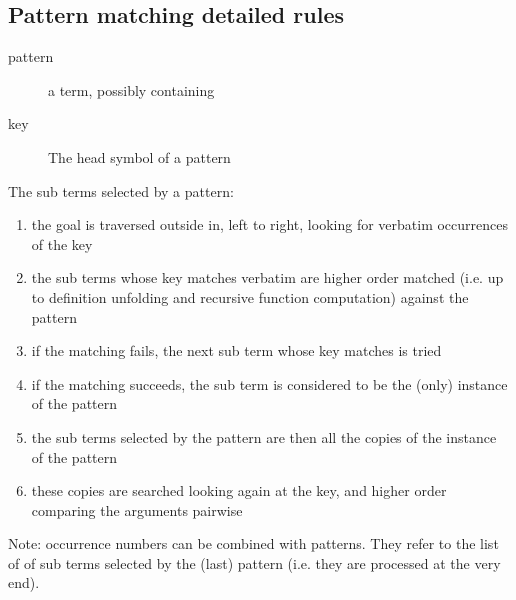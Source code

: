 \begin{landscape}
\begin{small}
\begin{multicols*}{3}[\begin{center}\section*{}\end{center}]




\subsection*{Pattern matching detailed rules}

\begin{description}
\item[pattern] a term, possibly containing \C{\_}
\item[key] The head symbol of a pattern
\end{description}

The sub terms selected by a pattern:
\begin{enumerate}
\item the goal is traversed outside in, left to right, looking for
      verbatim occurrences of the key
\item the sub terms whose key matches verbatim are higher order
      matched (i.e. up to definition unfolding and recursive function
      computation) against the pattern
\item if the matching fails, the next sub term whose key matches is tried
\item if the matching succeeds, the sub term is considered to be the
      (only) instance of the pattern
\item the sub terms selected by the pattern are then all the copies of the
      instance of the pattern
\item these copies are searched looking again at the key, and higher order
      comparing the arguments pairwise
\end{enumerate}

Note: occurrence numbers can be combined with patterns. They refer
to the list of of sub terms selected by the (last) pattern (i.e. they
are processed at the very end).


\end{multicols*}
\end{small}
\end{landscape}
